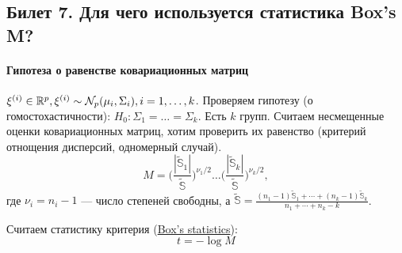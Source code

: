 \subsection{Билет 7. Для чего используется статистика Box's M?}
\paragraph{Гипотеза о равенстве ковариационных матриц}
$\xi^{(i)} \in \mathbb{R}^{p}, \xi^{(i)} \sim \mathcal{N}_p (\mu_i, \Sigma_i), i = 1, \dots, k$. Проверяем гипотезу (о гомостохастичности):
$H_0: \Sigma_1 = \dots = \Sigma_k$.
Есть $k$ групп. Считаем несмещенные оценки ковариационных матриц, хотим проверить их равенство (критерий отнощения дисперсий, одномерный случай).
%
\begin{equation*}
M = \Big (\frac{|\tilde{\mathbb{S}}_1|}{\tilde{\mathbb{S}}} \Big )^{\nu_1/2} \dots  \Big (\frac{|\tilde{\mathbb{S}}_k|}{\tilde{\mathbb{S}}} \Big )^{\nu_k/2},
\end{equation*}
%
где $\nu_i = n_i - 1$ --- число степеней свободны, а $\tilde{\mathbb{S}} = \frac{(n_1 - 1)\tilde{\mathbb{S}}_1 + \cdots + (n_k - 1)\tilde{\mathbb{S}}_k}{n_1 + \cdots + n_k - k}$.

Считаем статистику критерия (\underline{Box's statistics}):
%
\begin{equation*}
t = - \log M
\end{equation*}
%
